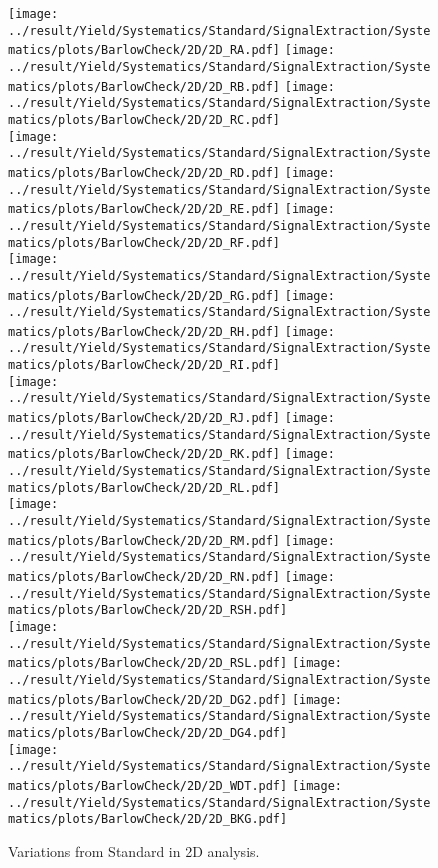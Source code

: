 \begin{figure}
	\centering
		\texttt{[image: ../result/Yield/Systematics/Standard/SignalExtraction/Systematics/plots/BarlowCheck/2D/2D\_RA.pdf]}
		\texttt{[image: ../result/Yield/Systematics/Standard/SignalExtraction/Systematics/plots/BarlowCheck/2D/2D\_RB.pdf]}
		\texttt{[image: ../result/Yield/Systematics/Standard/SignalExtraction/Systematics/plots/BarlowCheck/2D/2D\_RC.pdf]}\\
		\texttt{[image: ../result/Yield/Systematics/Standard/SignalExtraction/Systematics/plots/BarlowCheck/2D/2D\_RD.pdf]}
		\texttt{[image: ../result/Yield/Systematics/Standard/SignalExtraction/Systematics/plots/BarlowCheck/2D/2D\_RE.pdf]}
		\texttt{[image: ../result/Yield/Systematics/Standard/SignalExtraction/Systematics/plots/BarlowCheck/2D/2D\_RF.pdf]}\\
		\texttt{[image: ../result/Yield/Systematics/Standard/SignalExtraction/Systematics/plots/BarlowCheck/2D/2D\_RG.pdf]}
		\texttt{[image: ../result/Yield/Systematics/Standard/SignalExtraction/Systematics/plots/BarlowCheck/2D/2D\_RH.pdf]}
		\texttt{[image: ../result/Yield/Systematics/Standard/SignalExtraction/Systematics/plots/BarlowCheck/2D/2D\_RI.pdf]}\\
		\texttt{[image: ../result/Yield/Systematics/Standard/SignalExtraction/Systematics/plots/BarlowCheck/2D/2D\_RJ.pdf]}
		\texttt{[image: ../result/Yield/Systematics/Standard/SignalExtraction/Systematics/plots/BarlowCheck/2D/2D\_RK.pdf]}
		\texttt{[image: ../result/Yield/Systematics/Standard/SignalExtraction/Systematics/plots/BarlowCheck/2D/2D\_RL.pdf]}\\
		\texttt{[image: ../result/Yield/Systematics/Standard/SignalExtraction/Systematics/plots/BarlowCheck/2D/2D\_RM.pdf]}
		\texttt{[image: ../result/Yield/Systematics/Standard/SignalExtraction/Systematics/plots/BarlowCheck/2D/2D\_RN.pdf]}
		\texttt{[image: ../result/Yield/Systematics/Standard/SignalExtraction/Systematics/plots/BarlowCheck/2D/2D\_RSH.pdf]}\\
		\texttt{[image: ../result/Yield/Systematics/Standard/SignalExtraction/Systematics/plots/BarlowCheck/2D/2D\_RSL.pdf]}
		\texttt{[image: ../result/Yield/Systematics/Standard/SignalExtraction/Systematics/plots/BarlowCheck/2D/2D\_DG2.pdf]}
		\texttt{[image: ../result/Yield/Systematics/Standard/SignalExtraction/Systematics/plots/BarlowCheck/2D/2D\_DG4.pdf]}\\
		\texttt{[image: ../result/Yield/Systematics/Standard/SignalExtraction/Systematics/plots/BarlowCheck/2D/2D\_WDT.pdf]}
		\texttt{[image: ../result/Yield/Systematics/Standard/SignalExtraction/Systematics/plots/BarlowCheck/2D/2D\_BKG.pdf]}
		\caption{Variations from Standard in 2D analysis.}
		\label{fig:Barlow_SEX_2D}
\end{figure}

